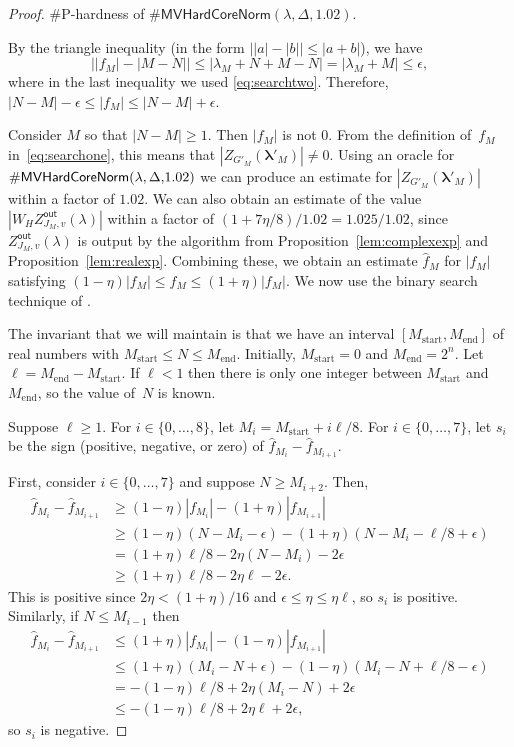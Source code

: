 \documentclass[11pt]{article}
\def\Zout{Z^{\mathsf{out}}}
\def\lambdab{\ensuremath{\boldsymbol{\lambda}}}
\def\FactorMVHardCore#1{\#\ensuremath{\mathsf{MVHardCoreNorm}(\lambda,\Delta,#1)}}
\begin{document}
\begin{proof}
 \#P-hardness of $\FactorMVHardCore{1.02}$.
   
By the triangle inequality (in the form $\big||a|-|b|\big|\leq |a+b|$),  we have
$$\big||f_M|- |M-N|\big|\leq |\lambda_M + N+M-N|= |\lambda_M + M| \leq \epsilon,$$
where in the last inequality we used \eqref{eq:searchtwo}. Therefore, $|N-M|-\epsilon \leq |f_M| \leq |N-M|+\epsilon$.

Consider $M$ so that
 $|N-M|\geq1$. Then
$|f_M|$ is not $0$. 
From the definition of~$f_M$ in~\eqref{eq:searchone}, 
this means that
$|Z_{G'_M}(\lambdab'_M)|\neq 0$.
Using an oracle for $\FactorMVHardCore{$1.02$}$ 
we can produce
an estimate for $|Z_{G'_M}(\lambdab'_M)|$ within a factor of $1.02$.
We can also obtain 
an estimate of the value 
$|W_H  \Zout_{J_M,v}(\lambda) |$ within a factor of $(1+7\eta/8)/1.02=1.025/1.02$, since $\Zout_{J_M,v}(\lambda)$ is
output by 
the algorithm from
Proposition~\ref{lem:complexexp} and Proposition~\ref{lem:realexp}. Combining these,  we obtain an estimate $\hat{f}_M$ for
$|f_M|$ 
satisfying
$(1-\eta) |f_M| \leq   \hat{f}_M \leq   (1+\eta) |f_M|$.
We now use the binary search technique of \cite{ComplexIsing}.

 
 The invariant that we will maintain is that we have an interval 
 $[M_{\text{start}},M_{\text{end}}]$ 
 of real numbers
 with $M_{\text{start}} \leq N \leq M_{\text{end}}$.
 Initially, $M_{\text{start}} =  0$ and $M_{\text{end}}=2^n$.
 Let $\ell=M_{\text{end}}-M_{\text{start}}$.
 If $\ell < 1$ then there is only one integer 
 between $M_{\text{start}}$ and $M_{\text{end}}$, so the value of~$N$ is known.
 
 Suppose $\ell\geq 1$. 
 For $i\in\{0,\ldots, 8\}$,
 let $M_i = M_{\text{start}} + i \ell/ 8$.
 For $i\in\{0,\ldots, 7\}$,
 let $s_i$ be the sign (positive, negative, or zero) of $\hat{f}_{M_i} - \hat{f}_{M_{i+1}}$.
 
 First, consider $i\in \{0,\ldots, 7\}$ and suppose 
 $N\geq M_{i+2}$.
 Then,
  \begin{align*}
 \hat{f}_{M_i} - \hat{f}_{M_{i+1}} &\geq
 (1-\eta) |f_{M_i}| - (1+\eta) | f_{M_{i+1}}|\\
 &\geq (1-\eta)(N-M_i - \epsilon) - (1+\eta) (N-M_i-\ell/ 8+\epsilon) \\
 &=  (1+\eta)\ell/ 8- 2 \eta (N-M_i)  - 2 \epsilon\\
 &\geq  (1+\eta)\ell/ 8 - 2 \eta  \ell  - 2 \epsilon.
 \end{align*}
 This is positive since $2\eta < (1+\eta)/16$ and  
 $\epsilon \leq \eta \leq \eta \ell$,  so $s_i$ is positive.
 Similarly, if $N \leq M_{i-1}$ then
  \begin{align*}
 \hat{f}_{M_{i}} - \hat{f}_{M_{i+1}} &\leq
 (1+\eta) |f_{M_i}| - (1-\eta) | f_{M_{i+1}}|\\
 &\leq (1+\eta)(M_i-N + \epsilon) - (1-\eta) (M_i-N+\ell/ 8-\epsilon) \\
 &=  -(1-\eta)\ell/ 8 + 2 \eta ( M_i-N)  + 2 \epsilon\\
   &\leq  -(1-\eta)\ell/ 8 + 2 \eta  \ell  + 2 \epsilon,
 \end{align*} 
 so $s_i$ is negative.
  

\end{proof}
\end{document}
